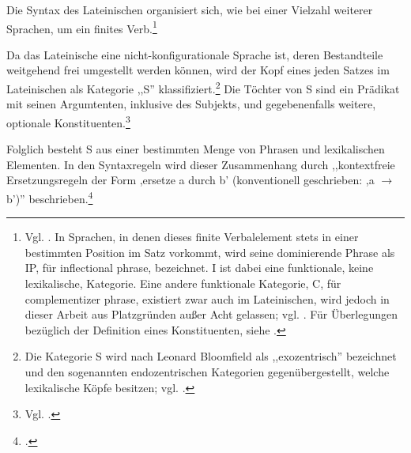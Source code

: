 \documentclass[12pt,a4paper]{article}
\begin{document}
Die Syntax des Lateinischen organisiert sich, wie bei einer Vielzahl weiterer Sprachen, um ein finites Verb.\footnote{Vgl. \cite[53]{Dal}. In Sprachen, in denen dieses finite Verbalelement stets in einer bestimmten Position im Satz vorkommt, wird seine dominierende Phrase als IP, für inflectional phrase, bezeichnet. I ist dabei eine funktionale, keine lexikalische, Kategorie. Eine andere funktionale Kategorie, C, für complementizer phrase, existiert zwar auch im Lateinischen, wird jedoch in dieser Arbeit aus Platzgründen außer Acht gelassen; vgl. \cite[46; 53; 63-5]{Dal}. Für Überlegungen bezüglich der Definition eines Konstituenten, siehe \cite[48-9]{Dal}.}

Da das Lateinische eine nicht-konfigurationale Sprache ist, deren Bestandteile weitgehend frei umgestellt werden können, wird der Kopf eines jeden Satzes im Lateinischen als Kategorie ,,S'' klassifiziert.\footnote{Die Kategorie S wird nach Leonard Bloomfield als ,,exozentrisch'' bezeichnet und den sogenannten endozentrischen Kategorien gegenübergestellt, welche lexikalische Köpfe besitzen; vgl. \cite[46]{Dal}.} Die Töchter von S sind ein Prädikat mit seinen Argumtenten, inklusive des Subjekts, und gegebenenfalls weitere, optionale Konstituenten.\footnote{Vgl. \cite[64-65]{Dal}.}

Folglich besteht S aus einer bestimmten Menge von Phrasen und lexikalischen Elementen. In den Syntaxregeln wird dieser Zusammenhang durch ,,kontextfreie Ersetzungsregeln der Form ,ersetze a durch b' (konventionell geschrieben: ,a $\rightarrow$ b')'' beschrieben.\footnote{\cite[18]{Rohrer}.}
\end{document}
